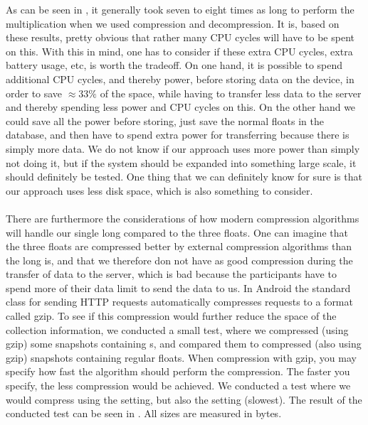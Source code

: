 As can be seen in , it generally took seven to eight times as long to perform the multiplication when we used compression and decompression. It is, based on these results, pretty obvious that rather many CPU cycles will have to be spent on this. With this in mind, one has to consider if these extra CPU cycles, extra battery usage, etc, is worth the tradeoff. On one hand, it is possible to spend additional CPU cycles, and thereby power, before storing data on the device, in order to save $\approx 33\%$ of the space, while having to transfer less data to the server and thereby spending less power and CPU cycles on this. On the other hand we could save all the power before storing, just save the normal floats in the database, and then have to spend extra power for transferring because there is simply more data. We do not know if our approach uses more power than simply not doing it, but if the system should be expanded into something large scale, it should definitely be tested. One thing that we can definitely know for sure is that our approach uses less disk space, which is also something to consider. 
\\\\
There are furthermore the considerations of how modern compression algorithms will handle our single long compared to the three floats. One can imagine that the three floats are compressed better by external compression algorithms than the long is, and that we therefore don not have as good compression during the transfer of data to the server, which is bad because the participants have to spend more of their data limit to send the data to us. In Android the standard class for sending HTTP requests automatically compresses requests to a format called gzip. To see if this compression would further reduce the space of the collection information, we conducted a small test, where we compressed (using gzip) some snapshots containing s, and compared them to compressed (also using gzip) snapshots containing regular floats. When compression with gzip, you may specify how fast the algorithm should perform the compression. The faster you specify, the less compression would be achieved. We conducted a test where we would compress using the  setting, but also the  setting (slowest). The result of the conducted test can be seen in . All sizes are measured in bytes.


